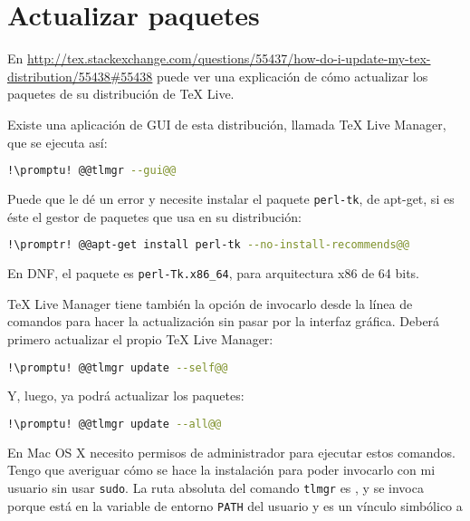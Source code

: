 \section{Actualizar paquetes}\label{sec:update-p}
En \url{http://tex.stackexchange.com/questions/55437/how-do-i-update-my-tex-distribution/55438#55438} puede ver
una explicación de cómo actualizar los paquetes de su distribución de \TeX{} Live.

Existe una aplicación de GUI de esta distribución, llamada \TeX{} Live Manager, que se ejecuta así:

\begin{lstlisting}[gobble=2,language=bash,style=bashinteract,escapechar=!]
  !\promptu! @@tlmgr --gui@@
\end{lstlisting}

\noindent Puede que le dé un error y necesite instalar el paquete \lstinline+perl-tk+, de apt-get, si es éste el
gestor de paquetes que usa en su distribución:

\begin{lstlisting}[gobble=2,language=bash,style=bashinteract,escapechar=!]
  !\promptr! @@apt-get install perl-tk --no-install-recommends@@
\end{lstlisting}

\noindent En DNF, el paquete es \lstinline+perl-Tk.x86_64+, para arquitectura x86 de 64 bits.

\TeX{} Live Manager tiene también la opción de invocarlo desde la línea de comandos para hacer la actualización
sin pasar por la interfaz gráfica. Deberá primero actualizar el propio \TeX{} Live Manager:

\begin{lstlisting}[gobble=2,language=bash,style=bashinteract,escapechar=!]
  !\promptu! @@tlmgr update --self@@
\end{lstlisting}

\noindent Y, luego, ya podrá actualizar los paquetes:

\begin{lstlisting}[gobble=2,language=bash,style=bashinteract,escapechar=!]
  !\promptu! @@tlmgr update --all@@
\end{lstlisting}

\noindent En Mac OS X necesito permisos de administrador para ejecutar estos comandos. Tengo que averiguar cómo
se hace la instalación para poder invocarlo con mi usuario sin usar \lstinline!sudo!. La ruta absoluta del
comando \lstinline!tlmgr! es , y se invoca porque
 está en la variable de entorno \lstinline!PATH! del usuario y  es un
vínculo simbólico a 

